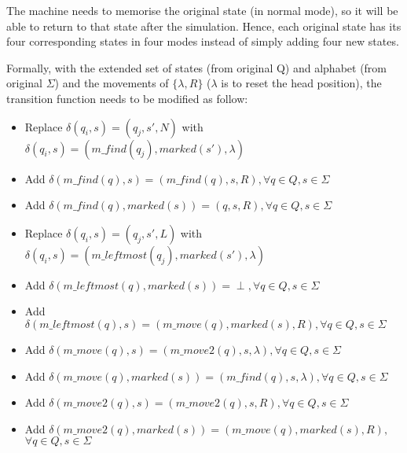 \documentclass{article}
\begin{document}
The machine needs to memorise the original state (in normal mode), so it will be able to return to that state after the simulation. Hence, each original state has its four corresponding states in four modes instead of simply adding four new states.

Formally, with the extended set of states (from original Q) and alphabet (from original $\Sigma$) and the movements of $\{\lambda,R\}$ ($\lambda$ is to reset the head position), the transition function needs to be modified as follow:
\begin{itemize}
    \item Replace $\delta(q_i, s) = (q_j, s', N)$ with $\delta(q_i, s) =(m\_find(q_j), marked(s'), \lambda)$
    \item Add $\delta(m\_find(q), s) = (m\_find(q), s, R),\forall q\in Q,s\in\Sigma$
    \item Add $\delta(m\_find(q), marked(s)) = (q, s, R),\forall q\in Q,s\in\Sigma$
    \item Replace $\delta(q_i, s) = (q_j, s', L)$ with $\delta(q_i, s) =(m\_leftmost(q_j), marked(s'), \lambda)$
    \item Add $\delta(m\_leftmost(q), marked(s)) = \perp,\forall q\in Q,s\in\Sigma$
    \item Add $\delta(m\_leftmost(q), s) = (m\_move(q), marked(s), R),\forall q\in Q,s\in\Sigma$
    \item Add $\delta(m\_move(q), s) = (m\_move2(q), s, \lambda),\forall q\in Q,s\in\Sigma$
    \item Add $\delta(m\_move(q), marked(s)) = (m\_find(q), s, \lambda),\forall q\in Q,s\in\Sigma$
    \item Add $\delta(m\_move2(q), s) = (m\_move2(q), s, R),\forall q\in Q,s\in\Sigma$
    \item Add $\delta(m\_move2(q), marked(s)) = (m\_move(q), marked(s), R),$\\
    $\forall q\in Q,s\in\Sigma$
\end{itemize}
\end{document}
